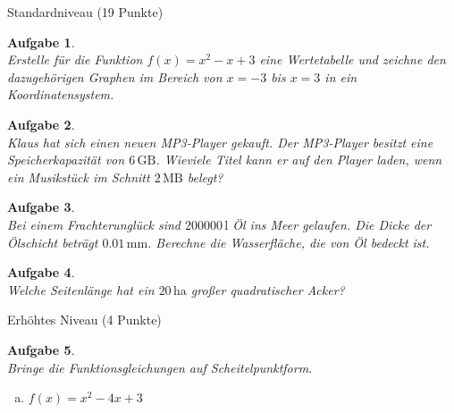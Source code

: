 \documentclass[12pt,fleqn]{article}
\theoremstyle{aufg}
\newtheorem{aufgabe}{Aufgabe}
\theoremstyle{bsp}
\begin{document}
\begin{flushleft}
 \clearpage 
\begin{center} \begin{framed} Standardniveau (19 Punkte) \end{framed} \end{center}\begin{aufgabe} ~ \\ 
Erstelle f\"ur die Funktion $f(x)=x^{2} - x + 3$ eine Wertetabelle und zeichne den dazugeh\"origen Graphen im Bereich von $x=-3$ bis $x=3$ in ein Koordinatensystem. \\ 
\end{aufgabe} 
\begin{aufgabe} ~ \\ 
Klaus hat sich einen neuen MP3-Player gekauft. Der MP3-Player besitzt eine Speicherkapazit\"at von $6\mathrm{\,GB}$. Wieviele Titel kann er auf den Player laden, wenn ein Musikst\"uck im Schnitt $2\mathrm{\,MB}$ belegt? 
\end{aufgabe} 
\begin{aufgabe} ~ \\ 
Bei einem Frachterungl\"uck sind $200000\mathrm{\,l}$ \"Ol ins Meer gelaufen. Die Dicke der \"Olschicht betr\"agt $0.01\mathrm{\,mm}$. Berechne die Wasserfl\"ache, die von \"Ol bedeckt ist.
\end{aufgabe} 
\begin{aufgabe} ~ \\ 
Welche Seitenl\"ange hat ein $20\mathrm{\,ha}$ gro\ss{}er quadratischer Acker?
\end{aufgabe} 
\begin{center} \begin{framed} Erh\"ohtes Niveau (4 Punkte) \end{framed} \end{center}\begin{aufgabe} ~ \\ 
Bringe die Funktionsgleichungen auf Scheitelpunktform. \\ 
\begin{multicols}{3} 
\begin{enumerate}[a)] 
\item 
$f(x)=x^{2} - 4 x + 3$
\end{enumerate} 
\end{multicols} 
\end{aufgabe} 
\end{flushleft} 
    
\end{document}
